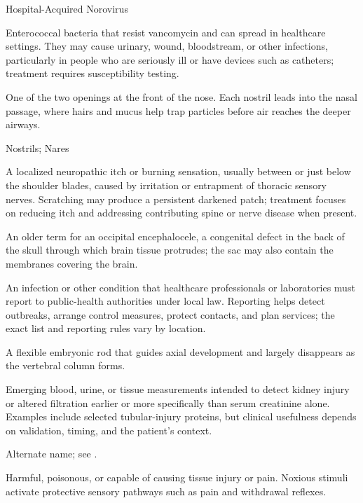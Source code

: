 \synonyms
Hospital-Acquired Norovirus

 Enterococcal bacteria that resist vancomycin and can spread in healthcare settings. They may cause urinary, wound, bloodstream, or other infections, particularly in people who are seriously ill or have devices such as catheters; treatment requires susceptibility testing.

 One of the two openings at the front of the nose. Each nostril leads into the nasal passage, where hairs and mucus help trap particles before air reaches the deeper airways.

\synonyms
Nostrils; Nares

 A localized neuropathic itch or burning sensation, usually between or just below the shoulder blades, caused by irritation or entrapment of thoracic sensory nerves. Scratching may produce a persistent darkened patch; treatment focuses on reducing itch and addressing contributing spine or nerve disease when present.

 An older term for an occipital encephalocele, a congenital defect in the back of the skull through which brain tissue protrudes; the sac may also contain the membranes covering the brain.

 An infection or other condition that healthcare professionals or laboratories must report to public-health authorities under local law. Reporting helps detect outbreaks, arrange control measures, protect contacts, and plan services; the exact list and reporting rules vary by location.

 A flexible embryonic rod that guides axial development and largely disappears as the vertebral column forms.

 Emerging blood, urine, or tissue measurements intended to detect kidney injury or altered filtration earlier or more specifically than serum creatinine alone. Examples include selected tubular-injury proteins, but clinical usefulness depends on validation, timing, and the patient’s context.

 Alternate name; see .

 Harmful, poisonous, or capable of causing tissue injury or pain. Noxious stimuli activate protective sensory pathways such as pain and withdrawal reflexes.

